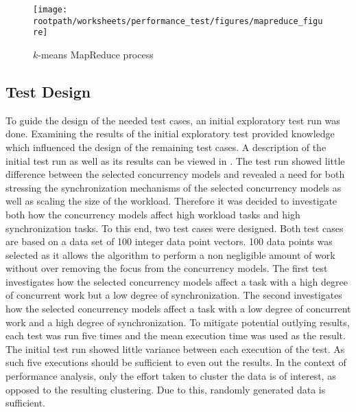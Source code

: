 \begin{figure}
\centering
\texttt{[image: \\rootpath/worksheets/performance\_test/figures/mapreduce\_figure]}
\caption{$k$-means MapReduce process}\label{fig:kmeans_mapreduce}
\end{figure}



\subsection{Test Design}
\label{sec:performance_test_design}
To guide the design of the needed test cases, an initial exploratory test run was done. Examining the results of the initial exploratory test provided knowledge which influenced the design of the remaining test cases. A description of the initial test run as well as its results can be viewed in . The test run showed little difference between the selected concurrency models and revealed a need for both stressing the synchronization mechanisms of the selected concurrency models as well as scaling the size of the workload. Therefore it was decided to investigate both how the concurrency models affect high workload tasks and high synchronization tasks. To this end, two test cases were designed. Both test cases are based on a data set of 100 integer data point vectors. 100 data points was selected as it allows the algorithm to perform a non negligible amount of work without over removing the focus from the concurrency models. The first test investigates how the selected concurrency models affect a task with a high degree of concurrent work but a low degree of synchronization. The second investigates how the selected concurrency models affect a task with a low degree of concurrent work and a high degree of synchronization. To mitigate potential outlying results, each test was run five times and the mean execution time was used as the result. The initial test run showed little variance between each execution of the test. As such five executions should be sufficient to even out the results. In the context of performance analysis, only the effort taken to cluster the data is of interest, as opposed to the resulting clustering. Due to this, randomly generated data is sufficient.


